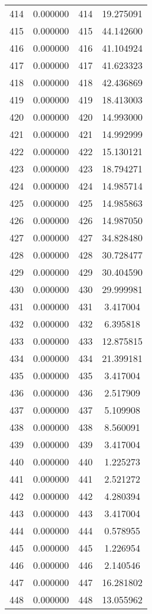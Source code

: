 \documentclass[12pt]{article}
\begin{document}
\begin{longtable}{@{}cccc@{}}
414 & 0.000000 & 414 & 19.275091 \\
415 & 0.000000 & 415 & 44.142600 \\
416 & 0.000000 & 416 & 41.104924 \\
417 & 0.000000 & 417 & 41.623323 \\
418 & 0.000000 & 418 & 42.436869 \\
419 & 0.000000 & 419 & 18.413003 \\
420 & 0.000000 & 420 & 14.993000 \\
421 & 0.000000 & 421 & 14.992999 \\
422 & 0.000000 & 422 & 15.130121 \\
423 & 0.000000 & 423 & 18.794271 \\
424 & 0.000000 & 424 & 14.985714 \\
425 & 0.000000 & 425 & 14.985863 \\
426 & 0.000000 & 426 & 14.987050 \\
427 & 0.000000 & 427 & 34.828480 \\
428 & 0.000000 & 428 & 30.728477 \\
429 & 0.000000 & 429 & 30.404590 \\
430 & 0.000000 & 430 & 29.999981 \\
431 & 0.000000 & 431 & 3.417004 \\
432 & 0.000000 & 432 & 6.395818 \\
433 & 0.000000 & 433 & 12.875815 \\
434 & 0.000000 & 434 & 21.399181 \\
435 & 0.000000 & 435 & 3.417004 \\
436 & 0.000000 & 436 & 2.517909 \\
437 & 0.000000 & 437 & 5.109908 \\
438 & 0.000000 & 438 & 8.560091 \\
439 & 0.000000 & 439 & 3.417004 \\
440 & 0.000000 & 440 & 1.225273 \\
441 & 0.000000 & 441 & 2.521272 \\
442 & 0.000000 & 442 & 4.280394 \\
443 & 0.000000 & 443 & 3.417004 \\
444 & 0.000000 & 444 & 0.578955 \\
445 & 0.000000 & 445 & 1.226954 \\
446 & 0.000000 & 446 & 2.140546 \\
447 & 0.000000 & 447 & 16.281802 \\
448 & 0.000000 & 448 & 13.055962 \\

\end{longtable}
\end{document}

